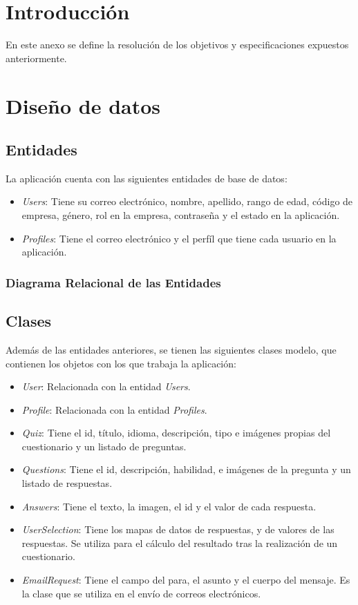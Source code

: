 
\section{Introducción}

En este anexo se define la resolución de los objetivos y especificaciones expuestos anteriormente.

\section{Diseño de datos}

\subsection{Entidades}
La aplicación cuenta con las siguientes entidades de base de datos:

\begin{itemize}
	\item \textit{Users}: Tiene su correo electrónico, nombre, apellido, rango de edad, código de empresa, género, rol en la empresa, contraseña y el estado en la aplicación.
	\item \textit{Profiles}: Tiene el correo electrónico y el perfíl que tiene cada usuario en la aplicación.
\end{itemize}
\clearpage
\subsubsection{Diagrama Relacional de las Entidades}

\subsection{Clases}
Además de las entidades anteriores, se tienen las siguientes clases modelo, que contienen los objetos con los que trabaja la aplicación:

\begin{itemize}
	\item \textit{User}: Relacionada con la entidad \textit{Users}.
	\item \textit{Profile}: Relacionada con la entidad \textit{Profiles}.
	\item \textit{Quiz}: Tiene el id, título, idioma, descripción, tipo e imágenes propias del cuestionario y un listado de preguntas.
	\item \textit{Questions}: Tiene el id, descripción, habilidad, e imágenes de la pregunta y un listado de respuestas.
	\item \textit{Answers}: Tiene el texto, la imagen, el id y el valor de cada respuesta.
	\item \textit{UserSelection}: Tiene los mapas de datos de respuestas, y de valores de las respuestas. Se utiliza para el cálculo del resultado tras la realización de un cuestionario.
	\item \textit{EmailRequest}: Tiene el campo del para, el asunto y el cuerpo del mensaje. Es la clase que se utiliza en el envío de correos electrónicos.
\end{itemize}
\clearpage
